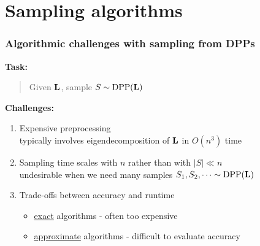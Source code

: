\documentclass{beamer}
\begin{document}

  



\section{Sampling algorithms}

\begin{frame}
  \frametitle{Algorithmic challenges with sampling from DPPs}
  \textbf{Task:}
  \begin{quote}
Given $\mathbf{L}$, sample $S\sim{\mathrm{DPP}}(\mathbf{L})$
  \end{quote}
\pause  \vspace{4mm}

  \textbf{Challenges:}
  \begin{enumerate}
  \item Expensive preprocessing \\[-1mm]
{\small typically involves eigendecomposition
  of $\mathbf{L}$ in $O(n^3)$ time}\pause
\vspace{2mm}
\item Sampling time scales with $n$ rather than with $|S|\ll n$\\[-1mm]
{\small undesirable when we need many samples
  $S_1,S_2,\dots\sim{\mathrm{DPP}}(\mathbf{L})$}\pause
\vspace{2mm}
\item Trade-offs between accuracy and runtime\\[-1mm]
  {\small   \begin{itemize}
\item \underline{exact} algorithms -  often too expensive
\item  \underline{approximate} algorithms - difficult to evaluate accuracy
\end{itemize} }
\end{enumerate}
\end{frame}
\end{document}

